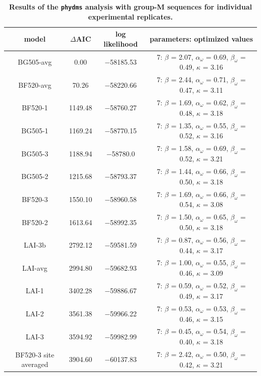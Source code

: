 \documentclass[9pt,lineno]{elife}
\begin{document}
\begin{table}
\centering
\caption[Results of the \texttt{phydms} analysis with group-M sequences for individual experimental replicates.]{
{\bf Results of the \texttt{phydms} analysis with group-M sequences for individual experimental replicates.}}
{\footnotesize
\begin{tabular}{cccc}
model & $\Delta$AIC & log likelihood & parameters: optimized values \\ 
\hline
BG505-avg & 0.00 & $-$58185.53 & 7: $\beta$ = 2.07, $\alpha_\omega$ = 0.69, $\beta_\omega$ = 0.49, $\kappa$ = 3.16\\
BF520-avg & 70.26 & $-$58220.66 & 7: $\beta$ = 2.44, $\alpha_\omega$ = 0.71, $\beta_\omega$ = 0.47, $\kappa$ = 3.11\\
BF520-1 & 1149.48 & $-$58760.27 & 7: $\beta$ = 1.69, $\alpha_\omega$ = 0.62, $\beta_\omega$ = 0.48, $\kappa$ = 3.18\\
BG505-1 & 1169.24 & $-$58770.15 & 7: $\beta$ = 1.35, $\alpha_\omega$ = 0.55, $\beta_\omega$ = 0.52, $\kappa$ = 3.16\\
BG505-3 & 1188.94 & $-$58780.0 & 7: $\beta$ = 1.58, $\alpha_\omega$ = 0.69, $\beta_\omega$ = 0.52, $\kappa$ = 3.21\\
BG505-2 & 1215.68 & $-$58793.37 & 7: $\beta$ = 1.44, $\alpha_\omega$ = 0.66, $\beta_\omega$ = 0.50, $\kappa$ = 3.18\\
BF520-3 & 1550.10 & $-$58960.58 & 7: $\beta$ = 1.69, $\alpha_\omega$ = 0.66, $\beta_\omega$ = 0.54, $\kappa$ = 3.08\\
BF520-2 & 1613.64 & $-$58992.35 & 7: $\beta$ = 1.50, $\alpha_\omega$ = 0.65, $\beta_\omega$ = 0.50, $\kappa$ = 3.18\\
LAI-3b & 2792.12 & $-$59581.59 & 7: $\beta$ = 0.87, $\alpha_\omega$ = 0.56, $\beta_\omega$ = 0.44, $\kappa$ = 3.17\\
LAI-avg & 2994.80 & $-$59682.93 & 7: $\beta$ = 1.00, $\alpha_\omega$ = 0.55, $\beta_\omega$ = 0.46, $\kappa$ = 3.09\\
LAI-1 & 3402.28 & $-$59886.67 & 7: $\beta$ = 0.59, $\alpha_\omega$ = 0.52, $\beta_\omega$ = 0.49, $\kappa$ = 3.17\\
LAI-2 & 3561.38 & $-$59966.22 & 7: $\beta$ = 0.53, $\alpha_\omega$ = 0.53, $\beta_\omega$ = 0.46, $\kappa$ = 3.15\\
LAI-3 & 3594.92 & $-$59982.99 & 7: $\beta$ = 0.45, $\alpha_\omega$ = 0.54, $\beta_\omega$ = 0.40, $\kappa$ = 3.18\\
BF520-3 site averaged & 3904.60 & $-$60137.83 & 7: $\beta$ = 2.42, $\alpha_\omega$ = 0.50, $\beta_\omega$ = 0.42, $\kappa$ = 3.21\\

\end{tabular}}
\end{table}
\end{document}
